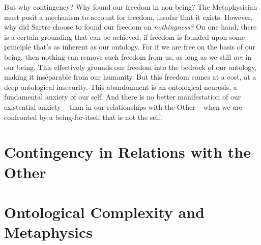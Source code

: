 

But why contingency? Why found our freedom in non-being? The Metaphysician must posit a mechanism to account for freedom, insofar that it exists. However, why did Sartre choose to found our freedom on \emph{nothingness?} On one hand, there is a certain grounding that can be achieved, if freedom is founded upon some principle that's as inherent as our ontology. For if we are free on the basis of our being, then nothing can remove such freedom from us, as long as we still \emph{are} in our being.  This effectively grounds our freedom into the bedrock of our ontology, making it inseparable from our humanity. But this freedom comes at a cost, at a deep ontological insecurity.  This abandonment is an ontological neurosis, a fundamental anxiety of our self. And there is no better manifestation of our existential anxiety -- than in our relationships with the Other -- when we are confronted by a being-for-itself that is not the self.


\section{Contingency in Relations with the Other}



\section{Ontological Complexity and Metaphysics}
 

